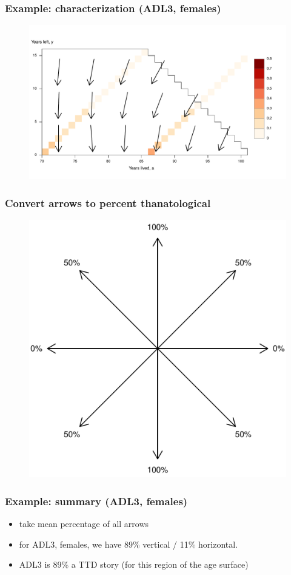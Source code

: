 \documentclass{beamer}
\begin{document}
\begin{frame}
\frametitle{Example: characterization (ADL3, females)}
\begin{figure}
\includegraphics[width=\linewidth]{Figures/SurfExampleFemalesADL3_3}
\end{figure}
\end{frame}

\begin{frame}
\frametitle{Convert arrows to percent thanatological}
\vspace{-1em}
\begin{figure}
\includegraphics[width=.5\linewidth]{Figures/ArrowDiagram}
\end{figure}
\end{frame}

\begin{frame}
\frametitle{Example: summary (ADL3, females)}
\begin{itemize}
  	\item take mean percentage of all arrows
	\item for ADL3, females, we have 89\% vertical / 11\% horizontal.
	\item ADL3 is 89\% a TTD story (for this region of the age surface)
\end{itemize}
\end{frame}
\end{document}
